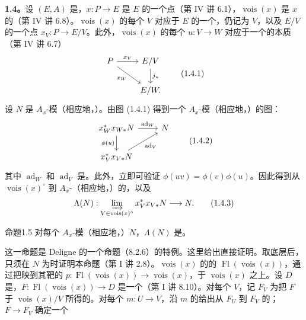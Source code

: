 \textbf{1.4。}设 $(E,A)$ 是，$x:P\to E$ 是 $E$ 的一个点（第 IV 讲 6.1），$\operatorname{vois}(x)$ 是 $x$ 的（第 IV 讲 6.8）。$\operatorname{vois}(x)$ 的每个 $V$ 对应于 $E$ 的一个，仍记为 $V$，以及 $E/V$ 的一个点 $x_V:P\to E/V$。此外，$\operatorname{vois}(x)$ 的每个 $u:V\to W$ 对应于一个的本质（第 IV 讲 6.7）
\[
\begin{tikzcd}
 P\arrow[r,"x_V"]\arrow[dr,"x_W"'] & E/V\arrow[d,"j_u"]\\
 &E/W.
\end{tikzcd}\tag{1.4.1}
\]
设 $N$ 是 $A_x$-模（相应地，）。由图 (1.4.1) 得到一个 $A_x$-模（相应地，）的图：
\[
\begin{tikzcd}
 x_W^*x_{W*}N\arrow[r,"\operatorname{ad}_W"]\arrow[d,"\phi(u)"']&N\\
 x_V^*x_{V*}N\arrow[ur,"\operatorname{ad}_V"']&
\end{tikzcd}\tag{1.4.2}
\]
其中 $\operatorname{ad}_W$ 和 $\operatorname{ad}_V$ 是。此外，立即可验证 $\phi(uv)=\phi(v)\phi(u)$。因此得到从 $\operatorname{vois}(x)^\circ$ 到 $A_x$-（相应地，）的，以及
\[
 \Lambda(N):\varinjlim_{V\in\operatorname{vois}(x)^\circ}x_V^*x_{V*}N\longrightarrow N.
 \tag{1.4.3}
\]
\begin{SGAresult}{命题}{1.5}
对每个 $A_x$-模（相应地，）$N$，$\Lambda(N)$ 是。
\end{SGAresult}
这一命题是 Deligne 的一个命题（8.2.6）的特例。这里给出直接证明。取底层后，只须在 $N$ 为时证明本命题（第 I 讲 2.8）。$\operatorname{vois}(x)$ 的的 $\operatorname{Fl}(\operatorname{vois}(x))$，通过把映到其靶的
$p:\operatorname{Fl}(\operatorname{vois}(x))\to\operatorname{vois}(x)$，于 $\operatorname{vois}(x)$ 之上。设 $D$ 是，$F:\operatorname{Fl}(\operatorname{vois}(x))\to D$ 是一个（第 I 讲 8.10）。对每个 $V$，记 $F_V$ 为把 $F$ 于 $\operatorname{vois}(x)/V$ 所得的。对每个 $m:U\to V$，沿 $m$ 的给出从 $F_U$ 到 $F_V$ 的； $F\to F_V$ 确定一个
